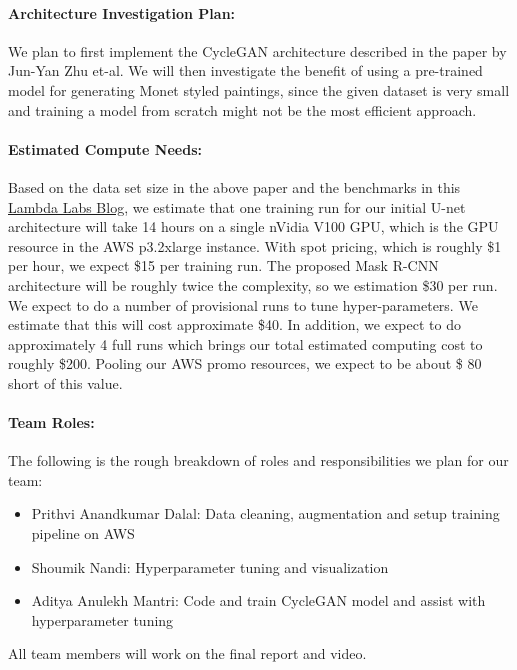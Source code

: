 \documentclass[11pt]{article}
\begin{document}
    \paragraph{Architecture Investigation Plan:}  We plan to first implement the CycleGAN architecture described in the paper by Jun-Yan Zhu et-al. We will then investigate the benefit of using a pre-trained model for generating Monet styled paintings, since the given dataset is very small and training a model from scratch might not be the most efficient approach.
    \paragraph{Estimated Compute Needs:}  Based on the data set size in the above paper and the benchmarks in this \href{https://lambdalabs.com/blog/titan-v-deep-learning-benchmarks/}{Lambda Labs Blog}, we estimate that one training run for our initial U-net architecture will take 14 hours on a single nVidia V100 GPU, which is the GPU resource in the AWS p3.2xlarge instance.  With spot pricing, which is roughly \$1 per hour, we expect \$15 per training run.  The proposed Mask R-CNN architecture will be roughly twice the complexity, so we estimation \$30 per run.  We expect to do a number of provisional runs to tune hyper-parameters.  We estimate that this will cost approximate \$40.  In addition, we expect to do approximately 4 full runs which brings our total estimated computing cost to roughly \$200.  Pooling our AWS promo resources, we expect to be about \$ 80 short of this value.

    \paragraph{Team Roles:} The following is the rough breakdown of roles and responsibilities we plan for our team:
    \begin{itemize}
        \item Prithvi Anandkumar Dalal: Data cleaning, augmentation and setup training pipeline on AWS
        \item Shoumik Nandi: Hyperparameter tuning and visualization
        \item Aditya Anulekh Mantri: Code and train CycleGAN model and assist with hyperparameter tuning
    \end{itemize}
    All team members will work on the final report and video.

\end{document}
